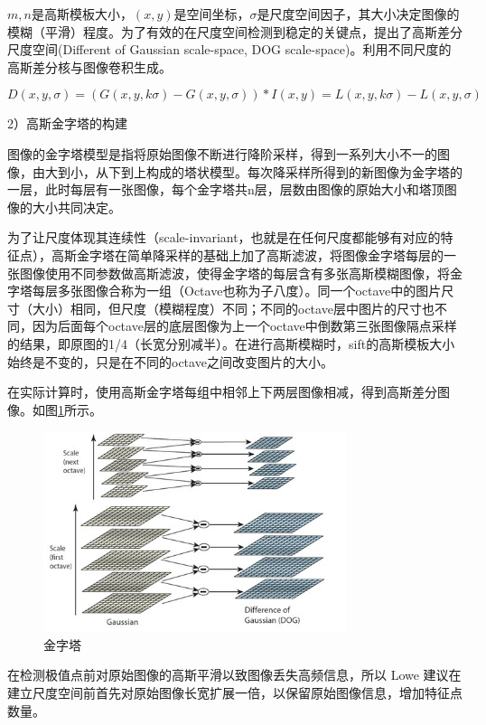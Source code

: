 \documentclass[12pt]{article}
\numberwithin{equation}{section}%
\begin{document}
$m,n$是高斯模板大小，$(x,y)$是空间坐标，$\sigma$是尺度空间因子，其大小决定图像的模糊（平滑）程度。为了有效的在尺度空间检测到稳定的关键点，提出了高斯差分尺度空间(Different of Gaussian scale-space, DOG scale-space)。利用不同尺度的高斯差分核与图像卷积生成。

\begin{equation}
D(x,y,\sigma)=(G(x,y,k\sigma)-G(x,y,\sigma))*I(x,y)=L(x,y,k\sigma)-L(x,y,\sigma)
\end{equation}

2）高斯金字塔的构建

图像的金字塔模型是指将原始图像不断进行降阶采样，得到一系列大小不一的图像，由大到小，从下到上构成的塔状模型。每次降采样所得到的新图像为金字塔的一层，此时每层有一张图像，每个金字塔共n层，层数由图像的原始大小和塔顶图像的大小共同决定。

为了让尺度体现其连续性（scale-invariant，也就是在任何尺度都能够有对应的特征点），高斯金字塔在简单降采样的基础上加了高斯滤波，将图像金字塔每层的一张图像使用不同参数做高斯滤波，使得金字塔的每层含有多张高斯模糊图像，将金字塔每层多张图像合称为一组（Octave也称为子八度）。同一个octave中的图片尺寸（大小）相同，但尺度（模糊程度）不同；不同的octave层中图片的尺寸也不同，因为后面每个octave层的底层图像为上一个octave中倒数第三张图像隔点采样的结果，即原图的1/4（长宽分别减半）。在进行高斯模糊时，sift的高斯模板大小始终是不变的，只是在不同的octave之间改变图片的大小。

在实际计算时，使用高斯金字塔每组中相邻上下两层图像相减，得到高斯差分图像。如图\ref{dog}所示。

\begin{figure}[!ht]
  \centering\includegraphics[width=3.5in]{dog.png}
  \caption{金字塔}
 \label{dog}
  \end{figure}

在检测极值点前对原始图像的高斯平滑以致图像丢失高频信息，所以 Lowe 建议在建立尺度空间前首先对原始图像长宽扩展一倍，以保留原始图像信息，增加特征点数量。
\end{document}
